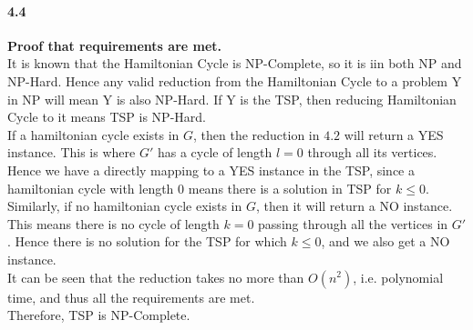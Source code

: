 \documentclass{article}
\begin{document}
\paragraph*{4.4} \textbf{Proof that requirements are met.} \\

\noindent
It is known that the Hamiltonian Cycle is NP-Complete, so it is iin both NP and NP-Hard. Hence any valid
reduction from the Hamiltonian Cycle to a problem Y in NP will mean Y is also NP-Hard. If Y is the TSP, then
reducing Hamiltonian Cycle to it means TSP is NP-Hard. \\

\noindent
If a hamiltonian cycle exists in $G$, then the reduction in $4.2$ will return a YES instance. This is where
$G'$ has a cycle of length $l = 0$ through all its vertices. Hence we have a directly mapping to a YES instance
in the TSP, since a hamiltonian cycle with length $0$ means there is a solution in TSP for $k \leq 0$. \\

\noindent
Similarly, if no hamiltonian cycle exists in $G$, then it will return a NO instance. This means there is
no cycle of length $k = 0$ passing through all the vertices in $G'$. Hence there is no solution for the
TSP for which $k \leq 0$, and we also get a NO instance. \\

\noindent
It can be seen that the reduction takes no more than $O(n^2)$, i.e. polynomial time, and thus all the requirements
are met. \\

\noindent
Therefore, TSP is NP-Complete. \\
\end{document}
